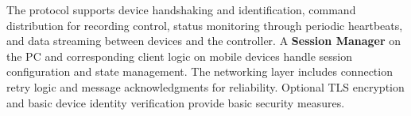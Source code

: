 \documentclass[12pt,a4paper]{article}
\begin{document}
 The protocol supports device handshaking and identification, command distribution for recording control, status monitoring through periodic heartbeats, and data streaming between devices and the controller. A \textbf{Session Manager} on the PC and corresponding client logic on mobile devices handle session configuration and state management. The networking layer includes connection retry logic and message acknowledgments for reliability. Optional TLS encryption and basic device identity verification provide basic security measures.
\end{document}
